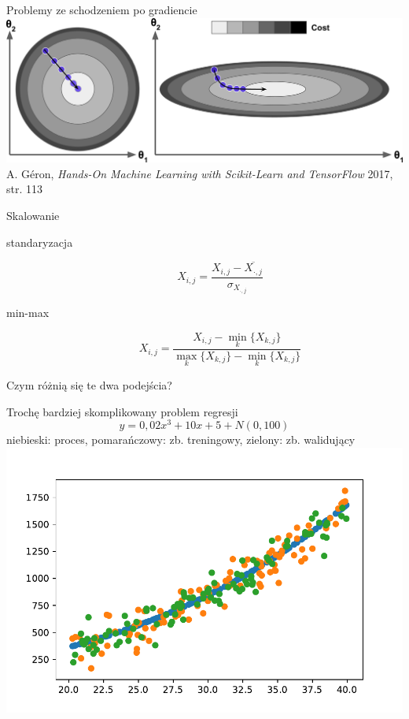 \documentclass{sa}
\begin{document}
\begin{frame}{Problemy ze schodzeniem po gradiencie}
\centering
\includegraphics[width=.95\textwidth]{grad-nofscaling.png}
{\vfill\footnotesize A. Géron, \emph{Hands-On Machine Learning with Scikit-Learn and TensorFlow} 2017, str. 113}
\end{frame}

\begin{frame}{Skalowanie}
\begin{description}
\item[standaryzacja] \[ X_{i,j} = \frac{X_{i,j}-\overline{X_{\cdot,j}}}{\sigma_{X_{\cdot,j}}} \]
\item[min-max] \[ X_{i,j} = \frac{X_{i,j}-\min_k\{X_{k,j}\}}{\max_k\{X_{k,j}\}-\min_k\{X_{k,j}\}} \]
\end{description}

\vfill
\alert{Czym różnią się te dwa podejścia?}
\end{frame}

\begin{frame}{Trochę bardziej skomplikowany problem regresji}
\[ y=0{,}02x^3+10x+5+N(0,100) \]
niebieski: proces, pomarańczowy: zb. treningowy, zielony: zb. walidujący
\centering
\includegraphics[width=.9\textwidth]{reg-2deg-with-noise.pdf}
\end{frame}
\end{document}
